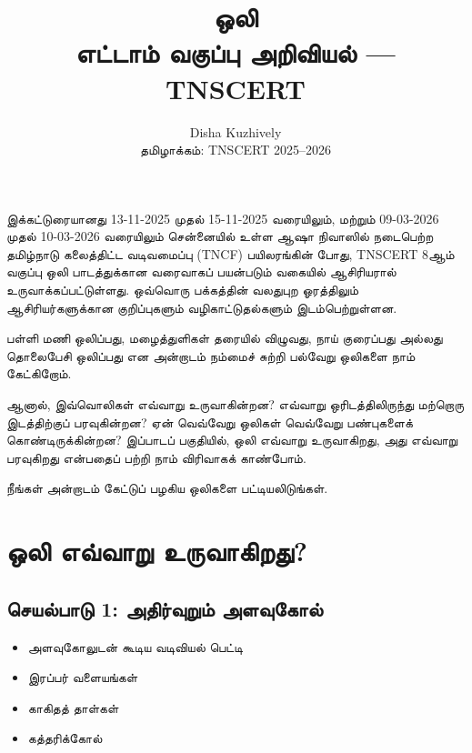 \documentclass[12pt,a4paper]{tufte-handout}
\title{ஒலி\\[0.3em]\large எட்டாம் வகுப்பு அறிவியல் --- TNSCERT}
\author{Disha Kuzhively \\ \small தமிழாக்கம்: TNSCERT 2025--2026}
\date{}
\begin{document}
\maketitle

\begin{tcolorbox}[enhanced, colback=gray!5, colframe=gray!50, fontupper=\small]
இக்கட்டுரையானது 13-11-2025 முதல் 15-11-2025 வரையிலும், மற்றும் 09-03-2026 முதல்
10-03-2026 வரையிலும் சென்னையில் உள்ள ஆஷா நிவாஸில் நடைபெற்ற தமிழ்நாடு கலைத்திட்ட
வடிவமைப்பு (TNCF) பயிலரங்கின் போது, TNSCERT 8ஆம் வகுப்பு ஒலி பாடத்துக்கான வரைவாகப்
பயன்படும் வகையில் ஆசிரியரால் உருவாக்கப்பட்டுள்ளது. ஒவ்வொரு பக்கத்தின் வலதுபுற ஓரத்திலும்
ஆசிரியர்களுக்கான குறிப்புகளும் வழிகாட்டுதல்களும் இடம்பெற்றுள்ளன.
\end{tcolorbox}

\bigskip

பள்ளி மணி ஒலிப்பது, மழைத்துளிகள் தரையில் விழுவது, நாய் குரைப்பது அல்லது தொலைபேசி
ஒலிப்பது என அன்றாடம் நம்மைச் சுற்றி பல்வேறு ஒலிகளை நாம் கேட்கிறோம்.

ஆனால், இவ்வொலிகள் எவ்வாறு உருவாகின்றன? எவ்வாறு ஒரிடத்திலிருந்து மற்றொரு
இடத்திற்குப் பரவுகின்றன? ஏன் வெவ்வேறு ஒலிகள் வெவ்வேறு பண்புகளைக்
கொண்டிருக்கின்றன? இப்பாடப் பகுதியில், ஒலி எவ்வாறு உருவாகிறது, அது எவ்வாறு
பரவுகிறது என்பதைப் பற்றி நாம் விரிவாகக் காண்போம்.


நீங்கள் அன்றாடம் கேட்டுப் பழகிய ஒலிகளை பட்டியலிடுங்கள்.

\section{ஒலி எவ்வாறு உருவாகிறது?}

\subsection*{செயல்பாடு 1: அதிர்வுறும் அளவுகோல்}

\begin{tcolorbox}[activitybox, title=தேவையான பொருட்கள்]
\begin{itemize}[noitemsep]
  \item அளவுகோலுடன் கூடிய வடிவியல் பெட்டி
  \item இரப்பர் வளையங்கள்
  \item காகிதத் தாள்கள்
  \item கத்தரிக்கோல்
\end{itemize}
\end{tcolorbox}
\end{document}
